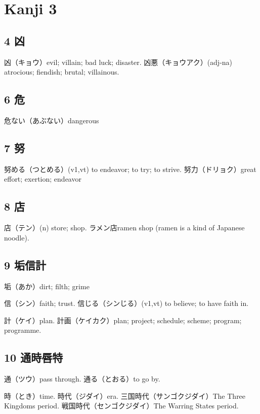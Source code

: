 \chapter{Kanji 3}

\section{4 凶}

凶（キョウ）evil; villain; bad luck; disaster.
凶悪（キョウアク）(adj-na) atrocious; fiendish; brutal; villainous.

\section{6 危}

危ない（あぶない）dangerous

\section{7 努}

努める（つとめる）(v1,vt) to endeavor; to try; to strive.
努力（ドリョク）great effort; exertion; endeavor

\section{8 店}

店（テン）(n) store; shop.
ラメン店ramen shop (ramen is a kind of Japanese noodle).

\section{9 垢信計}

垢（あか）dirt; filth; grime

信（シン）faith; trust.
信じる（シンじる）(v1,vt) to believe; to have faith in.

計（ケイ）plan.
計画（ケイカク）plan; project; schedule; scheme; program; programme.

\section{10 通時唇特}

通（ツウ）pass through.
通る（とおる）to go by.

時（とき）time.
時代（ジダイ）era.
三国時代（サンゴクジダイ）The Three Kingdoms period.
戦国時代（センゴクジダイ）The Warring States period.


